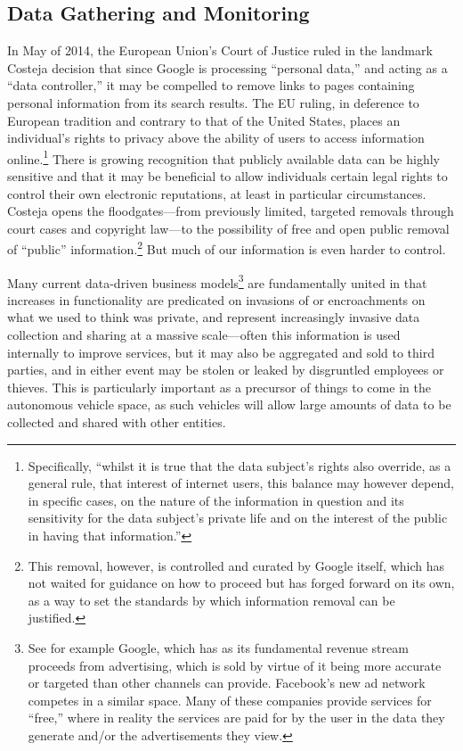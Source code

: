 \subsection{Data Gathering and Monitoring} 

 In May of 2014, the European
Union's Court of Justice 
ruled in the landmark Costeja decision that since Google is processing
``personal data,'' and acting as a ``data controller,'' it may be
compelled to remove links to pages containing personal information
from its search results.\cite{ICO} The EU ruling, in deference to European
tradition and contrary to that of the United States, places an
individual's rights to privacy above the ability of users to access
information online.\footnote{Specifically, ``whilst it is true that the
data subject’s rights also override, as a general rule, that interest
of internet users, this balance may however depend, in specific cases,
on the nature of the information in question and its sensitivity for
the data subject’s private life and on the interest of the public in
having that information.''\cite{COJCosteja}} There is growing recognition that publicly
available data can be highly sensitive and that it may be beneficial
to allow individuals certain legal rights to control their own
electronic reputations, at least in particular circumstances. Costeja
opens the floodgates---from previously limited, targeted removals
through court cases and copyright law---to the possibility of free and
open public removal of ``public'' information.\footnote{This removal,
  however, is controlled and curated by Google itself, which has not
  waited for guidance on how to proceed but has forged forward on its
  own, as a way to set the standards by which information removal can
  be justified.\cite{powlesChaparro}} But much of our
information is even harder to control.

Many current data-driven business models\footnote{See for example
  Google, which has as its fundamental revenue stream proceeds from
  advertising, which is sold by virtue of it being more accurate or
  targeted than other channels can provide. Facebook's new ad network
  competes in a similar space. Many of these companies provide
  services for ``free,'' where in reality the services are paid for by
the user in the data they generate and/or the advertisements they
view.} are fundamentally united in that increases in
functionality are predicated on invasions of or encroachments on what
we used to think was private, and represent increasingly invasive data
collection and sharing at a massive scale---often this information is
used internally to improve services, but it may also be aggregated and
sold to third parties, and in either event may be stolen or leaked by
disgruntled employees or thieves. This
is particularly important as a precursor of things to
come in the autonomous vehicle space, as such vehicles will allow
large amounts of data to be collected and shared with other entities. 

